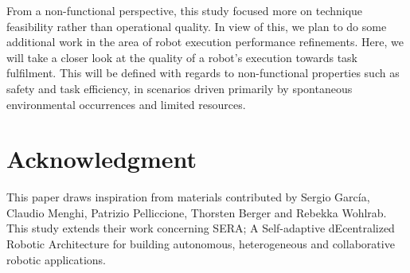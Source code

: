 \documentclass[conference]{IEEEtran}
\begin{document}
From a non-functional perspective, this study focused more on technique feasibility rather than operational quality. In view of this, we plan to do some additional work in the area of robot execution performance refinements. Here, we will take a closer look at the quality of a robot's execution towards task fulfilment. This will be defined with regards to non-functional properties such as safety and task efficiency, in scenarios driven primarily by spontaneous environmental occurrences and limited resources.

\section*{Acknowledgment}
This paper draws inspiration from materials contributed by Sergio Garc\'{i}a, Claudio Menghi, Patrizio Pelliccione, Thorsten Berger and Rebekka Wohlrab. This study extends their work concerning SERA; A Self-adaptive dEcentralized Robotic Architecture for building autonomous, heterogeneous and collaborative robotic applications.
\end{document}
